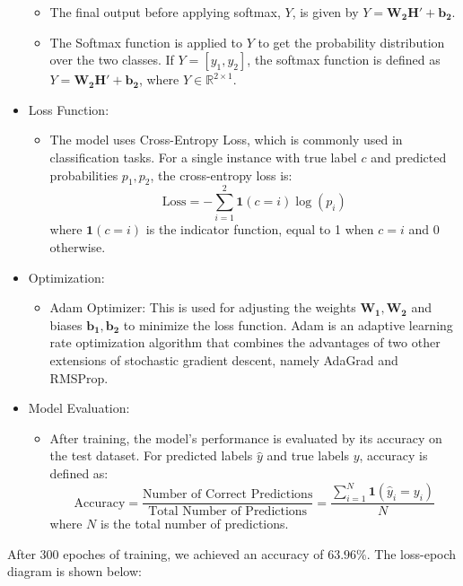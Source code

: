 \documentclass[11pt,a4paper]{article}
\begin{document}
\begin{itemize}
\begin{itemize}
			\item The final output before applying softmax, \( Y \), is given by \( Y = \mathbf{W_2} \mathbf{H'} + \mathbf{b_2} \).
			\item The Softmax function is applied to \( Y \) to get the probability distribution over the two classes. If \( Y = [y_1, y_2] \), the softmax function is defined as \( Y = \mathbf{W_2} \mathbf{H'} + \mathbf{b_2} \), where \( Y \in \mathbb{R}^{2 \times 1} \).
		\end{itemize}
		\item Loss Function:
		\begin{itemize}
			\item The model uses Cross-Entropy Loss, which is commonly used in classification tasks. For a single instance with true label \( c \) and predicted probabilities \( p_1, p_2 \), the cross-entropy loss is:
			 \[ \text{Loss} = -\sum_{i=1}^{2} \mathbf{1}(c = i) \log(p_i) \]
			where \( \mathbf{1}(c = i) \) is the indicator function, equal to 1 when \( c = i \) and 0 otherwise.
		\end{itemize}
		\item Optimization:
		\begin{itemize}
			\item Adam Optimizer: This is used for adjusting the weights \( \mathbf{W_1}, \mathbf{W_2} \) and biases \( \mathbf{b_1}, \mathbf{b_2} \) to minimize the loss function. Adam is an adaptive learning rate optimization algorithm that combines the advantages of two other extensions of stochastic gradient descent, namely AdaGrad and RMSProp.
		\end{itemize}
		\item Model Evaluation:
		\begin{itemize}
			\item After training, the model's performance is evaluated by its accuracy on the test dataset. For predicted labels \( \hat{y} \) and true labels \( y \), accuracy is defined as:
			\[ \text{Accuracy} = \frac{\text{Number of Correct Predictions}}{\text{Total Number of Predictions}} = \frac{\sum_{i=1}^{N} \mathbf{1}(\hat{y}_i = y_i)}{N} \]
			where \( N \) is the total number of predictions.
		\end{itemize}
	\end{itemize}
	
	After 300 epoches of training, we achieved an accuracy of $63.96\%$. The loss-epoch diagram is shown below:
		
\end{document}
